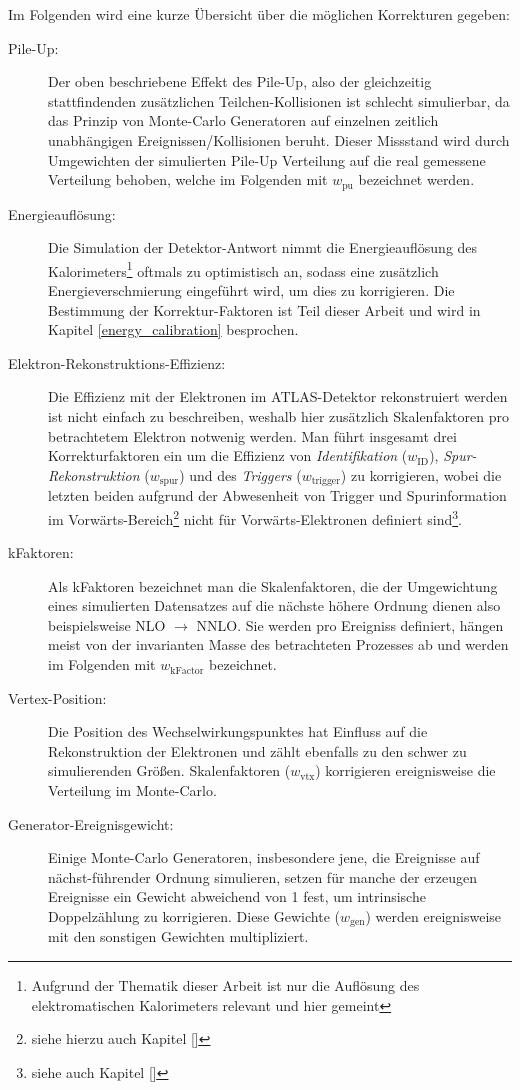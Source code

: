 Im Folgenden wird eine kurze Übersicht über die möglichen Korrekturen gegeben:

\begin{description}
    \item[Pile-Up:] Der oben beschriebene Effekt des Pile-Up, also der
        gleichzeitig stattfindenden zusätzlichen Teilchen-Kollisionen ist
        schlecht simulierbar, da das Prinzip von Monte-Carlo Generatoren auf
        einzelnen zeitlich unabhängigen Ereignissen/Kollisionen beruht. Dieser
        Missstand wird durch Umgewichten der simulierten Pile-Up Verteilung auf
        die real gemessene Verteilung behoben, welche im Folgenden mit
        $w_\text{pu}$ bezeichnet werden.
    \item[Energieauflösung:] Die Simulation der Detektor-Antwort nimmt die
        Energieauflösung des Kalorimeters\footnote{Aufgrund der Thematik dieser
        Arbeit ist nur die Auflösung des elektromatischen Kalorimeters relevant
        und hier gemeint} oftmals zu optimistisch an, sodass eine zusätzlich
        Energieverschmierung eingeführt wird, um dies zu korrigieren. Die
        Bestimmung der Korrektur-Faktoren ist Teil dieser Arbeit und wird in
        Kapitel \ref{energy_calibration} besprochen.
    \item[Elektron-Rekonstruktions-Effizienz:] Die Effizienz mit der Elektronen
        im ATLAS-Detektor rekonstruiert werden ist nicht einfach zu
        beschreiben, weshalb hier zusätzlich Skalenfaktoren pro betrachtetem
        Elektron notwenig werden. Man führt insgesamt drei Korrekturfaktoren
        ein um die Effizienz von \textit{Identifikation} ($w_\text{ID}$),
        \textit{Spur-Rekonstruktion} ($w_\text{spur}$) und des
        \textit{Triggers} ($w_\text{trigger}$) zu korrigieren, wobei die
        letzten beiden aufgrund der Abwesenheit von Trigger und Spurinformation
        im Vorwärts-Bereich\footnote{siehe hierzu auch Kapitel \ref{}} nicht
        für Vorwärts-Elektronen definiert sind\footnote{siehe auch Kapitel
        \ref{}}.
    \item[kFaktoren:] Als kFaktoren bezeichnet man die Skalenfaktoren, die der
        Umgewichtung eines simulierten Datensatzes auf die nächste höhere
        Ordnung dienen also beispielsweise NLO $\rightarrow$ NNLO. Sie werden
        pro Ereigniss definiert, hängen meist von der invarianten Masse des
        betrachteten Prozesses ab und werden im Folgenden mit
        $w_\text{kFactor}$ bezeichnet.
    \item[Vertex-Position:] Die Position des Wechselwirkungspunktes hat
        Einfluss auf die Rekonstruktion der Elektronen und zählt ebenfalls zu
        den schwer zu simulierenden Größen. Skalenfaktoren ($w_\text{vtx}$)
        korrigieren ereignisweise die Verteilung im Monte-Carlo.
    \item[Generator-Ereignisgewicht:] Einige Monte-Carlo Generatoren,
        insbesondere jene, die Ereignisse auf nächst-führender Ordnung
        simulieren, setzen für manche der erzeugen Ereignisse ein Gewicht
        abweichend von 1 fest, um intrinsische Doppelzählung zu korrigieren.
        Diese Gewichte ($w_\text{gen}$) werden ereignisweise mit den sonstigen
        Gewichten multipliziert.
\end{description}

